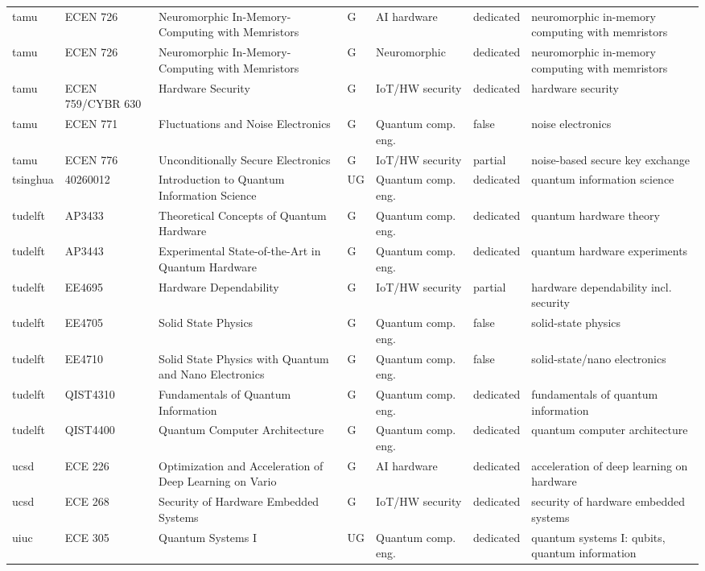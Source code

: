\documentclass[10pt]{article}
\begin{document}
\begin{longtable}{@{}llL{4.6cm}llll@{}}
tamu & ECEN 726 & Neuromorphic In-Memory-Computing with Memristors & G & AI hardware & dedicated & neuromorphic in-memory computing with memristors \\
tamu & ECEN 726 & Neuromorphic In-Memory-Computing with Memristors & G & Neuromorphic & dedicated & neuromorphic in-memory computing with memristors \\
tamu & ECEN 759/CYBR 630 & Hardware Security & G & IoT/HW security & dedicated & hardware security \\
tamu & ECEN 771 & Fluctuations and Noise Electronics & G & Quantum comp. eng. & false & noise electronics \\
tamu & ECEN 776 & Unconditionally Secure Electronics & G & IoT/HW security & partial & noise-based secure key exchange \\
tsinghua & 40260012 & Introduction to Quantum Information Science & UG & Quantum comp. eng. & dedicated & quantum information science \\
tudelft & AP3433 & Theoretical Concepts of Quantum Hardware & G & Quantum comp. eng. & dedicated & quantum hardware theory \\
tudelft & AP3443 & Experimental State-of-the-Art in Quantum Hardware & G & Quantum comp. eng. & dedicated & quantum hardware experiments \\
tudelft & EE4695 & Hardware Dependability & G & IoT/HW security & partial & hardware dependability incl. security \\
tudelft & EE4705 & Solid State Physics & G & Quantum comp. eng. & false & solid-state physics \\
tudelft & EE4710 & Solid State Physics with Quantum and Nano Electronics & G & Quantum comp. eng. & false & solid-state/nano electronics \\
tudelft & QIST4310 & Fundamentals of Quantum Information & G & Quantum comp. eng. & dedicated & fundamentals of quantum information \\
tudelft & QIST4400 & Quantum Computer Architecture & G & Quantum comp. eng. & dedicated & quantum computer architecture \\
ucsd & ECE 226 & Optimization and Acceleration of Deep Learning on Vario & G & AI hardware & dedicated & acceleration of deep learning on hardware \\
ucsd & ECE 268 & Security of Hardware Embedded Systems & G & IoT/HW security & dedicated & security of hardware embedded systems \\
uiuc & ECE 305 & Quantum Systems I & UG & Quantum comp. eng. & dedicated & quantum systems I: qubits, quantum information \\

\end{longtable}
\end{document}
